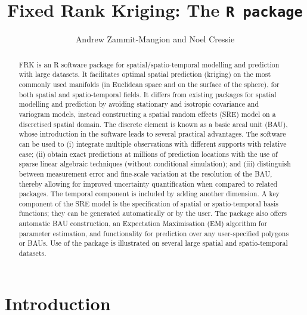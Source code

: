 \documentclass{article}\usepackage[]{graphicx}\usepackage[]{color}
\title{Fixed Rank Kriging: The \tt{R} package}
\author{Andrew Zammit-Mangion and Noel Cressie}
\newcommand{\pkg}[1]{{\fontseries{b}\selectfont #1}}
\let\proglang=\textsf
\begin{document}

\maketitle

\begin{abstract}
\pkg{FRK} is an \proglang{R} software package for spatial/spatio-temporal modelling and prediction with large datasets. It facilitates optimal spatial prediction (kriging) on the most commonly used manifolds (in Euclidean space and on the surface of the sphere), for both spatial and spatio-temporal fields. It differs from existing packages for spatial modelling and prediction by avoiding stationary and isotropic covariance and variogram models, instead constructing a spatial random effects (SRE) model on a discretised spatial domain. The discrete element is known as a basic areal unit (BAU), whose introduction in the software leads to several practical advantages. The software can be used to (i)  integrate multiple observations with different supports with relative ease; (ii) obtain exact predictions at millions of prediction locations with the use of sparse linear algebraic techniques (without conditional simulation); and (iii) distinguish between measurement error and fine-scale variation at the resolution of the BAU, thereby allowing for improved uncertainty quantification when compared to related packages. The temporal component is included by adding another dimension. A key component of the SRE model is the specification of spatial or spatio-temporal basis functions; they can be generated automatically or by the user. The package also offers automatic BAU construction, an Expectation Maximisation (EM) algorithm for parameter estimation, and functionality for prediction over any user-specified polygons or BAUs. Use of the package is illustrated on several large spatial and spatio-temporal datasets.

\end{abstract}


\tableofcontents

\newpage

\section{Introduction}\label{sec:intro}
\end{document}
